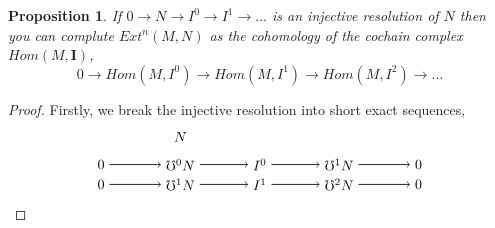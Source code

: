 \documentclass[11.5pt, twoside, a4paper, titlepage]{report}
\theoremstyle{definition}
\theoremstyle{plain}
\newtheorem{prop}[mydef]{Proposition}
\begin{document}
\begin{prop}
If $0\xrightarrow{}N \xrightarrow{} I^0 \xrightarrow{} I^1 \xrightarrow{} \dots $ is an injective resolution of $N$ then you can complute $Ext^n(M,N)$ as the cohomology of the cochain complex $Hom(M,\mathbf{I})$,
\begin{equation*}
0 \xrightarrow{} Hom(M,I^0) \xrightarrow{} Hom(M, I^1) \xrightarrow{} Hom(M,I^2) \xrightarrow{} \dots
\end{equation*}
\end{prop}
\begin{proof}
Firstly, we break the injective resolution into short exact sequences,
\begin{equation*}
\begin{tikzpicture}[->,-latex, auto, main path/.style={->, semithick}, main node/.style={}]
\node	[main node]		(2) at (2,0)		{$0$};
\node	[main node]		(3) at (4,0)		{$\mho^0N$};
\node [main node]		(4) at (6,0)		{$I^0$};
\node [main node]		(5) at (8,0)		{$\mho^1N$};
\node	[main node]		(11) at (10,0)	{$0$};
\node [main node] 		(12) at (4, 0.7) 	{$N$};

\node	[main node]		(7) at (2,-0.5)	{$0$};
\node	[main node]		(8) at (4,-0.5)	{$\mho^1N$};
\node [main node]		(9) at (6,-0.5)	{$I^1$};
\node [main node]		(10) at (8,-0.5)	{$\mho^2N$};
\node [main node]		(13) at (10,-0.5)	{$0$};

\draw (2) edge [main path] node [auto] {$$} (3);
\draw (3) edge [main path] node [auto] {$$} (4);
\draw (4) edge [main path] node [auto] {$$} (5);
\draw (5) edge [main path] node [auto] {$$} (11);

\draw (7) edge [main path] node [auto] {$$} (8);
\path (8) edge [main path] node [auto, swap] {$$} (9);
\draw (9) edge [main path] node [auto, swap] {$$} (10);
\draw (10) edge [main path] node [auto, swap] {$$} (13);


\end{tikzpicture}
\end{equation*}
\end{proof}
\end{document}
